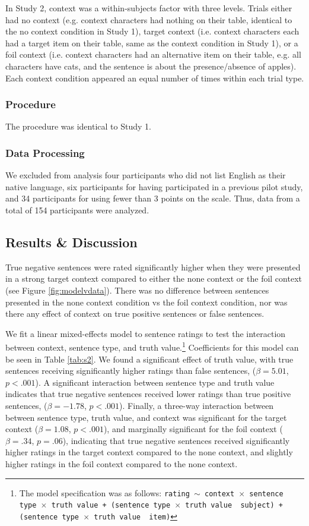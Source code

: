 \documentclass[10pt,letterpaper]{article}
\begin{document}
In Study 2, context was a within-subjects factor with three levels.  Trials either had no context (e.g. context characters had nothing on their table, identical to the no context condition in Study 1), target context (i.e. context characters each had a target item on their table, same as the context condition in Study 1), or a foil context (i.e. context characters had an alternative item on their table, e.g. all characters have cats, and the sentence is about the presence/absence of apples).  Each context condition appeared an equal number of times within each trial type.  

\subsubsection{Procedure}
The procedure was identical to Study 1.

\subsubsection{Data Processing}
We excluded from analysis four participants who did not list English as their native language, six participants for having participated in a previous pilot study, and 34 participants for using fewer than 3 points on the scale.  Thus, data from a total of 154 participants were analyzed.  

\subsection{Results \& Discussion}
True negative sentences were rated significantly higher when they were presented in a strong target context compared to either the none context or the foil context (see Figure \ref{fig:modelvdata}).  There was no difference between sentences presented in the none context condition vs the foil context condition, nor was there any effect of context on true positive sentences or false sentences.  

We fit a linear mixed-effects model to sentence ratings to test the interaction between context, sentence type, and truth value.\footnote{ The model specification was as follows: \texttt{rating $\sim$ context~$\times$~sentence type~$\times$~truth value + (sentence type~$\times$~truth value~\textbar~subject) +  (sentence type~$\times$~truth value~\textbar~item)}}  Coefficients for this model can be seen in Table \ref{tab:s2}.  We found a significant effect of truth value, with true sentences receiving significantly higher ratings than false sentences, ($\beta= 5.01$, $p< .001$).  A significant interaction between sentence type and truth value indicates that true negative sentences received lower ratings than true positive sentences, ($\beta= -1.78$, $p< .001$).  Finally, a three-way interaction between between sentence type, truth value, and context was significant for the target context ($\beta= 1.08$, $p< .001$), and marginally significant for the foil context ($\beta= .34$, $p=.06$), indicating that true negative sentences received significantly higher ratings in the target context compared to the none context, and slightly higher ratings in the foil context compared to the none context.  
\end{document}
